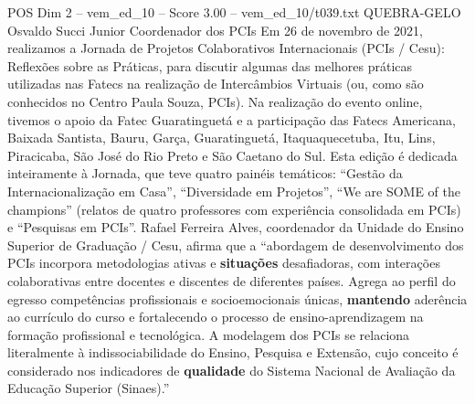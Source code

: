 \begin{textsample}{POS Dim 2 – vem\_ed\_10 – Score 3.00 – vem\_ed\_10/t039.txt}  \label{ex:f2_pos_186}
QUEBRA-GELO Osvaldo Succi Junior Coordenador dos PCIs Em 26 de novembro de 2021, realizamos a Jornada de Projetos Colaborativos Internacionais (PCIs / Cesu): Reflexões sobre as Práticas, para discutir algumas das melhores práticas utilizadas nas Fatecs na realização de Intercâmbios Virtuais (ou, como são conhecidos no Centro Paula Souza, PCIs).
Na realização do evento online, tivemos o apoio da Fatec Guaratinguetá e a participação das Fatecs Americana, Baixada Santista, Bauru, Garça, Guaratinguetá, Itaquaquecetuba, Itu, Lins, Piracicaba, São José do Rio Preto e São Caetano do Sul.
Esta edição é dedicada inteiramente à Jornada, que teve quatro painéis temáticos: “Gestão da Internacionalização em Casa”, “Diversidade em Projetos”, “We are SOME of the champions” (relatos de quatro professores com experiência consolidada em PCIs) e “Pesquisas em PCIs”.
Rafael Ferreira Alves, coordenador da Unidade do Ensino Superior de Graduação / Cesu, afirma que a “abordagem de desenvolvimento dos PCIs incorpora metodologias ativas e \textbf{situações} desafiadoras, com interações colaborativas entre docentes e discentes de diferentes países.
Agrega ao perfil do egresso competências profissionais e socioemocionais únicas, \textbf{mantendo} aderência ao currículo do curso e fortalecendo o processo de ensino-aprendizagem na formação profissional e tecnológica.
A modelagem dos PCIs se relaciona literalmente à indissociabilidade do Ensino, Pesquisa e Extensão, cujo conceito é considerado nos indicadores de \textbf{qualidade} do Sistema Nacional de Avaliação da Educação Superior (Sinaes).”

\end{textsample}
